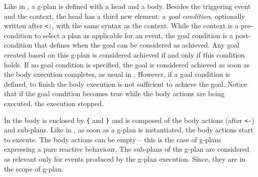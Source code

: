 Like in {\asl}, a g-plan is defined with a head and a body.
%
Besides the triggering event and the context, the head has a third new element: a \emph{goal condition}, optionally written after \texttt{<:}, with the same syntax as the context. While the context is a pre-condition to select a plan as applicable for an event, the goal condition is a post-condition that defines when the goal can be considered as achieved. Any goal created based on this g-plan is considered achieved if and only if this condition holds. If no goal condition is specified, the goal is considered achieved as soon as the body execution completes, as usual in \asl. However, if a goal condition is defined, to finish the body execution is not sufficient to achieve the goal. Notice that if the goal condition becomes true while the body actions are being executed, the execution stopped.

In {\aser} the body is enclosed by \texttt{\{} and \texttt{\}} and is composed of the body actions (after \texttt{<-}) and sub-plans. 
%
Like in {\asl}, as soon as a g-plan is instantiated, the body actions start to execute. The body actions can be empty -- this is the case of g-plans expressing a pure reactive behaviour.
%
The sub-plans of the g-plan are considered as relevant only for events produced by the g-plan execution. Since, they are in the scope of g-plan. 

%
%
%


